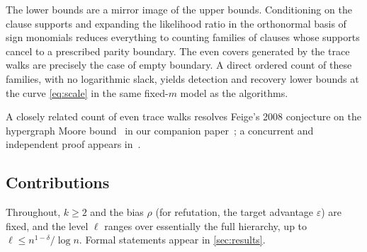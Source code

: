 \documentclass[11pt]{article}
\theoremstyle{definition}
\theoremstyle{remark}
\newcommand{\1}{\mathbf 1}
\newcommand{\eps}{\varepsilon}
\numberwithin{equation}{section}
\begin{document}
The lower bounds are a mirror image of the upper bounds.  Conditioning
on the clause supports and expanding the likelihood ratio in the
orthonormal basis of sign monomials reduces everything to counting families of clauses whose supports cancel to a prescribed parity boundary. The even covers generated by the trace walks are precisely the case of empty boundary.
A direct ordered count of these families, with no logarithmic slack,
yields detection and recovery lower bounds at the curve \cref{eq:scale}
in the same fixed-$m$ model as the algorithms.

A closely related count of even trace walks resolves Feige's 2008
conjecture on the hypergraph Moore bound~\cite{Feige} in our companion
paper~\cite{SHmoore}; a concurrent and independent proof appears
in~\cite{BKNPRW}.


\subsection{Contributions}\label{sec:contributions}

Throughout, $k\ge2$ and the bias $\rho$ (for refutation, the target
advantage $\eps$) are fixed, and the level $\ell$ ranges over
essentially the full hierarchy, up to $\ell\le n^{1-\delta}/\log n$.
Formal statements appear in \cref{sec:results}.
\end{document}
